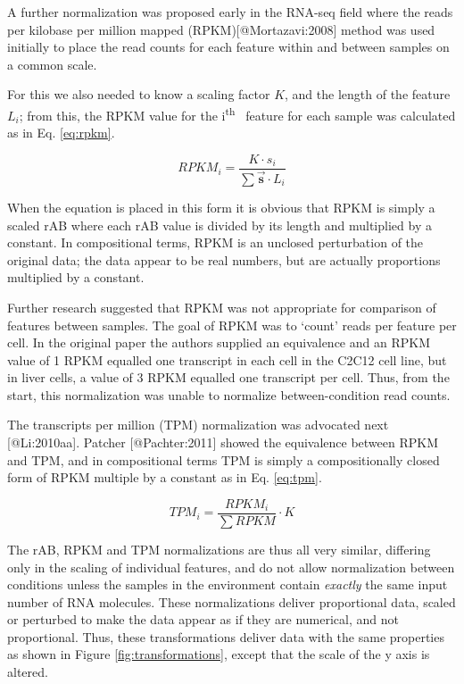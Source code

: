\documentclass[
  onecolumn]{article}
\newcommand{\ith}[1]{ #1\textsuperscript{th}\ }
\newcommand{\vect}[1]{\vec{\textbf{#1}}}
\begin{document}
A further normalization was proposed early in the RNA-seq field where the reads per kilobase per million mapped (RPKM){[}@Mortazavi:2008{]} method was used initially to place the read counts for each feature within and between samples on a common scale.

For this we also needed to know a scaling factor \(K\), and the length of the feature \(L_i\); from this, the RPKM value for the \ith{i} feature for each sample was calculated as in Eq. \ref{eq:rpkm}.

\begin{equation}
    RPKM_{i} = \frac{K \cdot s_{i} }{\sum{\vect{s}} \cdot L_{i}}
    \label{eq:rpkm}
\end{equation}

When the equation is placed in this form it is obvious that RPKM is simply a scaled rAB where each rAB value is divided by its length and multiplied by a constant. In compositional terms, RPKM is an unclosed perturbation of the original data; the data appear to be real numbers, but are actually proportions multiplied by a constant.

Further research suggested that RPKM was not appropriate for comparison of features between samples. The goal of RPKM was to `count' reads per feature per cell. In the original paper the authors supplied an equivalence and an RPKM value of 1 RPKM equalled one transcript in each cell in the C2C12 cell line, but in liver cells, a value of 3 RPKM equalled one transcript per cell. Thus, from the start, this normalization was unable to normalize between-condition read counts.

The transcripts per million (TPM) normalization was advocated next {[}@Li:2010aa{]}. Patcher {[}@Pachter:2011{]} showed the equivalence between RPKM and TPM, and in compositional terms TPM is simply a compositionally closed form of RPKM multiple by a constant as in Eq. \ref{eq:tpm}.

\begin{equation}
    TPM_{i} = \frac{RPKM_i}{\sum{RPKM}} \cdot K
    \label{eq:tpm}
\end{equation}

The rAB, RPKM and TPM normalizations are thus all very similar, differing only in the scaling of individual features, and do not allow normalization between conditions unless the samples in the environment contain \emph{exactly} the same input number of RNA molecules. These normalizations deliver proportional data, scaled or perturbed to make the data appear as if they are numerical, and not proportional. Thus, these transformations deliver data with the same properties as shown in Figure \ref{fig:transformations}, except that the scale of the y axis is altered.
\end{document}
